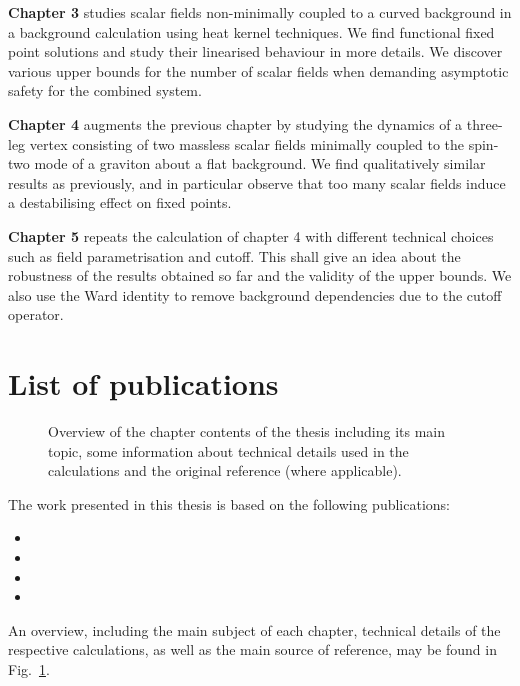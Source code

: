 \documentclass[11pt]{book}
\numberwithin{equation}{chapter}
\begin{document}
\medskip
\textbf{Chapter 3} studies scalar fields non-minimally coupled to a curved background
in a background calculation using heat kernel techniques. We find functional fixed point
solutions and study their linearised behaviour in more details. We discover various
upper bounds for the number of scalar fields when demanding asymptotic safety for
the combined system.

\medskip
\textbf{Chapter 4} augments the previous chapter by studying the dynamics
of a three-leg vertex consisting of two massless scalar fields minimally coupled to
the spin-two mode of a graviton about a flat background.
We find qualitatively similar results as previously, and in particular observe
that too many scalar fields induce a destabilising effect on fixed points.

\medskip
\textbf{Chapter 5} repeats the calculation of chapter 4 with different technical choices
such as field parametrisation and cutoff. This shall give an idea about the
robustness of the results obtained so far and the validity of the upper bounds.
We also use the Ward identity to remove background dependencies due to the
cutoff operator.


\section*{List of publications}

\begin{figure}
  \begin{center}
    
  \end{center}
  \caption{
    Overview of the chapter contents of the thesis including its main topic, some information
    about technical details used in the calculations and the original reference (where applicable).
  }
  \label{fig:overview}
\end{figure}

The work presented in this thesis is based on the following publications:%
\bigskip
\begin{itemize}
  \setlength\itemsep{0.7em}
  \item {}
  \item {}
  \item {}
  \item {}
\end{itemize}
\bigskip
An overview, including the main subject of each chapter, technical details
of the respective calculations, as well as the main source of reference, may be found in
Fig.~\ref{fig:overview}.
\end{document}
